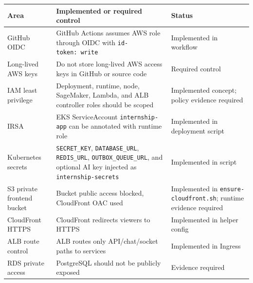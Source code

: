 {
\begingroup
\small
\setlength{\tabcolsep}{3pt}
\renewcommand{\arraystretch}{1.15}
\begin{longtable}{@{}
  >{\raggedright\arraybackslash}p{}
  >{\raggedright\arraybackslash}p{}
  >{\raggedright\arraybackslash}p{}@{}}
\toprule\noalign{}
\begin{minipage}[b]{\linewidth}\raggedright
Area
\end{minipage} & \begin{minipage}[b]{\linewidth}\raggedright
Implemented or required control
\end{minipage} & \begin{minipage}[b]{\linewidth}\raggedright
Status
\end{minipage} \\
\midrule\noalign{}
\endhead
\bottomrule\noalign{}
\endlastfoot
GitHub OIDC & GitHub Actions assumes AWS role through OIDC with
\texttt{id-\allowbreak{}token:\ write} & Implemented in workflow \\
Long-lived AWS keys & Do not store long-lived AWS access keys in GitHub
or source code & Required control \\
IAM least privilege & Deployment, runtime, node, SageMaker, Lambda, and
ALB controller roles should be scoped & Implemented concept; policy
evidence required \\
IRSA & EKS ServiceAccount \texttt{internship-\allowbreak{}app} can be annotated with
runtime role & Implemented in deployment script \\
Kubernetes secrets & \texttt{SECRET\_\allowbreak{}KEY}, \texttt{DATABASE\_\allowbreak{}URL},
\texttt{REDIS\_\allowbreak{}URL}, \texttt{OUTBOX\_\allowbreak{}QUEUE\_\allowbreak{}URL}, and optional AI key
injected as \texttt{internship-\allowbreak{}secrets} & Implemented in script \\
S3 private frontend bucket & Bucket public access blocked, CloudFront
OAC used & Implemented in \texttt{ensure-\allowbreak{}cloudfront.\allowbreak{}sh}; runtime
evidence required \\
CloudFront HTTPS & CloudFront redirects viewers to HTTPS & Implemented
in helper config \\
ALB route control & ALB routes only API/chat/socket paths to services &
Implemented in Ingress \\
RDS private access & PostgreSQL should not be publicly exposed &
Evidence required \\

\end{longtable}}
